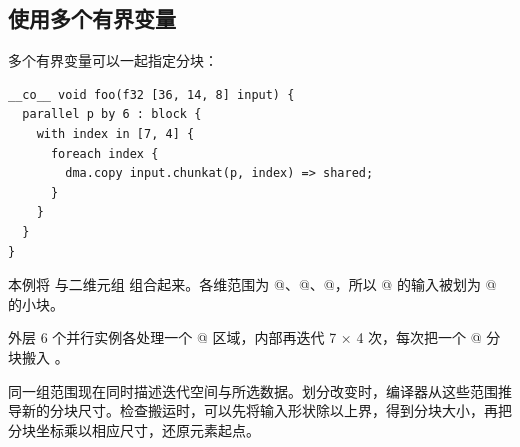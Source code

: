 \subsection*{使用多个有界变量}

多个有界变量可以一起指定分块：

\begin{lstlisting}[language=croqtile,caption={使用多个有界变量}]
__co__ void foo(f32 [36, 14, 8] input) {
  parallel p by 6 : block {
    with index in [7, 4] {
      foreach index {
        dma.copy input.chunkat(p, index) => shared;
      }
    }
  }
}
\end{lstlisting}

本例将 \co@p@ 与二维元组 \co@index@ 组合起来。各维范围为 @、@、@，所以 \co@[36, 14, 8]@ 的输入被划为 \co@[6, 2, 2]@ 的小块。

外层 6 个并行实例各处理一个 \co@[6, 14, 8]@ 区域，内部再迭代 7 × 4 次，每次把一个 \co@[6, 2, 2]@ 分块搬入 \co@shared@。

同一组范围现在同时描述迭代空间与所选数据。划分改变时，编译器从这些范围推导新的分块尺寸。检查搬运时，可以先将输入形状除以上界，得到分块大小，再把分块坐标乘以相应尺寸，还原元素起点。
